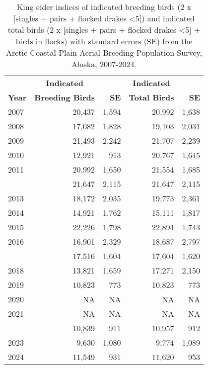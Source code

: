 \documentclass[
]{article}
\begin{document}
\begingroup\fontsize{10}{12}\selectfont

\begin{longtable}[t]{lrrrr}

\caption{\label{tbl-KIEI}King eider indices of indicated breeding birds
(2 x {[}singles + pairs + flocked drakes \textless5{]}) and indicated
total birds (2 x {[}singles + pairs + flocked drakes \textless5{]} +
birds in flocks) with standard errors (SE) from the Arctic Coastal Plain
Aerial Breeding Population Survey, Alaska, 2007-2024.}

\tabularnewline

\\
\toprule
\multicolumn{1}{c}{\textbf{ }} & \multicolumn{1}{c}{\textbf{Indicated}} & \multicolumn{1}{c}{\textbf{ }} & \multicolumn{1}{c}{\textbf{Indicated}} & \multicolumn{1}{c}{\textbf{ }} \\
\cmidrule(l{3pt}r{3pt}){2-2} \cmidrule(l{3pt}r{3pt}){4-4}
\textbf{Year} & \textbf{Breeding Birds} & \textbf{SE} & \textbf{Total Birds} & \textbf{SE}\\
\midrule
2007 & 20,437 & 1,594 & 20,992 & 1,638\\
2008 & 17,082 & 1,828 & 19,103 & 2,031\\
2009 & 21,493 & 2,242 & 21,707 & 2,239\\
2010 & 12,921 & 913 & 20,767 & 1,645\\
2011 & 20,992 & 1,650 & 21,554 & 1,685\\
\addlinespace
2012 & 21,647 & 2,115 & 21,647 & 2,115\\
2013 & 18,172 & 2,035 & 19,773 & 2,361\\
2014 & 14,921 & 1,762 & 15,111 & 1,817\\
2015 & 22,226 & 1,798 & 22,894 & 1,743\\
2016 & 16,901 & 2,329 & 18,687 & 2,797\\
\addlinespace
2017 & 17,516 & 1,604 & 17,604 & 1,620\\
2018 & 13,821 & 1,659 & 17,271 & 2,150\\
2019 & 10,823 & 773 & 10,823 & 773\\
2020 & NA & NA & NA & NA\\
2021 & NA & NA & NA & NA\\
\addlinespace
2022 & 10,839 & 911 & 10,957 & 912\\
2023 & 9,630 & 1,080 & 9,774 & 1,089\\
2024 & 11,549 & 931 & 11,620 & 953\\
\bottomrule

\end{longtable}
\end{document}
